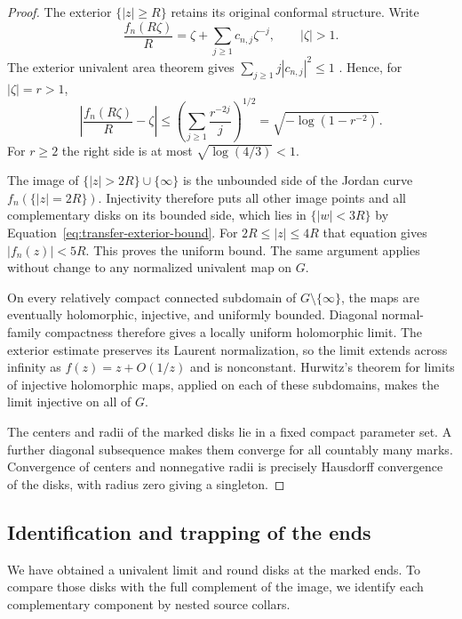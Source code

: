 \begin{proof}
The exterior $\{|z|\ge R\}$ retains its original conformal
structure.  Write
\[
 \frac{f_n(R\zeta)}R
 =\zeta+\sum_{j\ge1}c_{n,j}\zeta^{-j},\qquad |\zeta|>1.
\]
The exterior univalent area theorem gives
$\sum_{j\ge1}j|c_{n,j}|^2\le1$
\cite[Theorem~5-1]{Ahlfors1973}.  Hence, for $|\zeta|=r>1$,
\begin{equation}\label{eq:transfer-exterior-bound}
 \left|\frac{f_n(R\zeta)}R-\zeta\right|
 \le\left(\sum_{j\ge1}\frac{r^{-2j}}j\right)^{1/2}
 =\sqrt{-\log(1-r^{-2})}.
\end{equation}
For $r\ge2$ the right side is at most
$\sqrt{\log(4/3)}<1$.

The image of $\{|z|>2R\}\cup\{\infty\}$ is the unbounded side of
the Jordan curve $f_n(\{|z|=2R\})$.  Injectivity therefore puts all
other image points and all complementary disks on its bounded side,
which lies in $\{|w|<3R\}$ by
Equation~\eqref{eq:transfer-exterior-bound}.  For
$2R\le|z|\le4R$ that equation gives $|f_n(z)|<5R$.  This proves the
uniform bound.  The same argument applies without change to any
normalized univalent map on $G$.

On every relatively compact connected subdomain of
$G\setminus\{\infty\}$, the maps are eventually holomorphic,
injective, and uniformly bounded.  Diagonal normal-family compactness
therefore gives a locally uniform holomorphic limit.  The exterior
estimate preserves its Laurent normalization, so the limit extends
across infinity as $f(z)=z+O(1/z)$ and is nonconstant.  Hurwitz's
theorem for limits of injective holomorphic maps, applied on each of
these subdomains, makes the limit injective on all of $G$.

The centers and radii of the marked disks lie in a fixed compact
parameter set.  A further diagonal subsequence makes them converge
for all countably many marks.  Convergence of centers and nonnegative
radii is precisely Hausdorff convergence of the disks, with radius
zero giving a singleton.
\end{proof}

\subsection{Identification and trapping of the ends}

We have obtained a univalent limit and round disks at the marked
ends.  To compare those disks with the full complement of the image,
we identify each complementary component by nested source collars.

